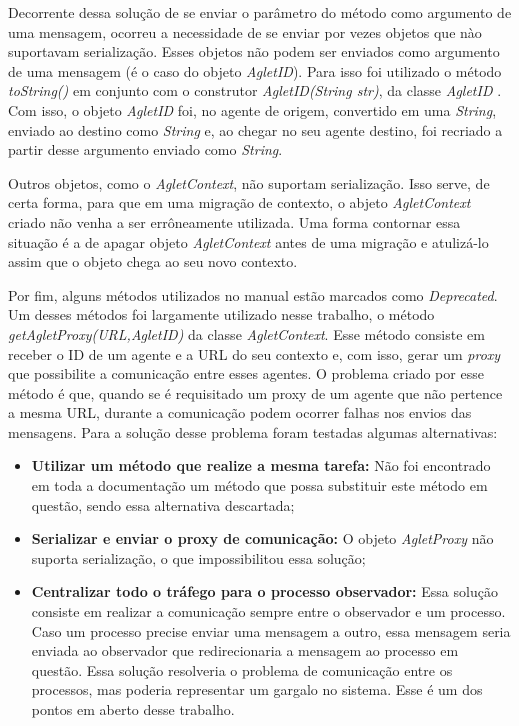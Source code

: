 Decorrente dessa solução de se enviar o parâmetro do método como argumento de uma mensagem, ocorreu a necessidade de se enviar por vezes objetos que nào suportavam serialização. Esses objetos não podem ser enviados como argumento de uma mensagem (é o caso do objeto \textit{AgletID}). Para isso foi utilizado o método \textit{toString()} em conjunto com o construtor \textit{AgletID(String str)}, da classe \textit{AgletID} . Com isso, o objeto \textit{AgletID} foi, no agente de origem, convertido em uma \textit{String}, enviado ao destino como \textit{String} e, ao chegar no seu agente destino, foi recriado a partir desse argumento enviado como \textit{String}.

Outros objetos, como o \textit{AgletContext}, não suportam serialização. Isso serve, de certa forma, para que em uma migração de contexto, o abjeto \textit{AgletContext} criado não venha a ser errôneamente utilizada. Uma forma contornar essa situação é a de apagar objeto \textit{AgletContext} antes de uma migração e atulizá-lo assim que o objeto chega ao seu novo contexto.

Por fim, alguns métodos utilizados no manual estão marcados como \textit{Deprecated}. Um desses métodos foi largamente utilizado nesse trabalho, o método \textit{getAgletProxy(URL,AgletID)} da classe \textit{AgletContext}. Esse método consiste em receber o ID de um agente e a URL do seu contexto e, com isso, gerar um \textit{proxy} que possibilite a comunicação entre esses agentes. O problema criado por esse método é que, quando se é requisitado um proxy de um agente que não pertence a mesma URL, durante a comunicação podem ocorrer falhas nos envios das mensagens. Para a solução desse problema foram testadas algumas alternativas:

\begin{itemize}
	\item \textbf{Utilizar um método que realize a mesma tarefa:} Não foi encontrado em toda a documentação um método que possa substituir este método em questão, sendo essa alternativa descartada;
	\item \textbf{Serializar e enviar o proxy de comunicação:} O objeto \textit{AgletProxy} não suporta serialização, o que impossibilitou essa solução;
	\item \textbf{Centralizar todo o tráfego para o processo observador:} Essa solução consiste em realizar a comunicação sempre entre o observador e um processo. Caso um processo precise enviar uma mensagem a outro, essa mensagem seria enviada ao observador que redirecionaria a mensagem ao processo em questão. Essa solução resolveria o problema de comunicação entre os processos, mas poderia representar um gargalo no sistema. Esse é um dos pontos em aberto desse trabalho.
\end{itemize}


